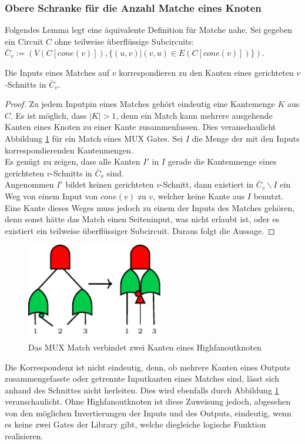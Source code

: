 \documentclass[11pt, a4paper, german]{article}
\begin{document}
\subsubsection{Obere Schranke für die Anzahl Matche eines Knoten}
\label{subsubsec:anzahl_matchings}
Folgendes Lemma legt eine äquivalente Definition für Matche nahe.
Sei gegeben ein Circuit $C$ ohne teilweise überflüssige Subcircuits: \\$\bar{C}_v := (V(C[cone(v)]), \{ (u,v) | (v,u) \in E(C[cone(v)])\})$.
\begin{lemma}{Die Inputs eines Matches auf $v$ korrespondieren zu den Kanten eines gerichteten $v$-Schnitts in $\bar{C}_v $}.
\end{lemma}
\begin{proof}
Zu jedem Inputpin eines Matches gehört eindeutig eine Kantemenge $K$ aus $C$. Es ist möglich, dass $|K| > 1$, denn ein Match kann mehrere ausgehende Kanten eines Knoten zu einer Kante zusammenfassen. Dies veranschaulicht Abbildung \ref{bild:mux_match} für ein Match eines MUX Gates.  Sei $I$ die Menge der mit den Inputs korrespondierenden Kantenmengen.\\
Es genügt zu zeigen, dass alle Kanten $I'$ in $I$ gerade die Kantenmenge eines gerichteten $v$-Schnitts in $\bar{C}_v$ sind. \\
Angenommen $I'$ bildet keinen gerichteten $v$-Schnitt, dann existiert in $\bar{C}_v\backslash I$ ein Weg von einem Input von $cone(v)$ zu $v$, welcher keine Kante aus $I$ benutzt. \\
Eine Kante dieses Weges muss jedoch zu einem der Inputs des Matches gehören, denn sonst hätte das Match einen Seiteninput, was nicht erlaubt ist, oder es existiert ein teilweise überflüssiger Subcircuit. Daraus folgt die Aussage. 
\end{proof}
\begin{figure}
		\includegraphics[width = 6cm]{pictures/compiled/mux_match}
		\caption{Das MUX Match verbindet zwei Kanten eines Highfanoutknoten}
		\label{bild:mux_match}
\end{figure}
Die Korrespondenz ist nicht eindeutig, denn, ob mehrere Kanten eines Outputs zusammengefasste oder getrennte Inputkanten eines Matches sind, lässt sich anhand des Schnittes nicht herleiten. Dies wird ebenfalls durch Abbildung \ref{bild:mux_match} veranschaulicht. Ohne Highfanoutknoten ist diese Zuweisung jedoch, abgesehen von den möglichen Invertierungen der Inputs und des Outputs, eindeutig, wenn es keine zwei Gates der Library gibt, welche diegleiche  logische Funktion realisieren.\\
\end{document}
